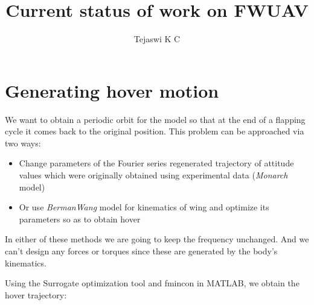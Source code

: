 \documentclass[10pt]{article}
\date{}
\author{Tejaswi K C}
\title{Current status of work on FWUAV}
\begin{document}
\maketitle

\section{Generating hover motion}
We want to obtain a periodic orbit for the model so that at the end of a flapping cycle it comes back to the original position. This problem can be approached via two ways:
\begin{itemize}
	\item Change parameters of the Fourier series regenerated trajectory of attitude values which were originally obtained using experimental data (\textit{Monarch} model)
	\item Or use \textit{BermanWang} model for kinematics of wing and optimize its parameters so as to obtain hover
\end{itemize}
In either of these methods we are going to keep the frequency unchanged. And we can't design any forces or torques since these are generated by the body's kinematics.


Using the Surrogate optimization tool and fmincon in MATLAB, we obtain the hover trajectory:
%
\end{document}
